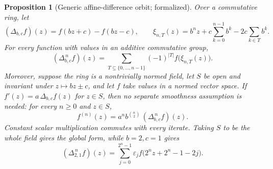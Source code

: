 \documentclass[11pt]{article}
\newtheorem{proposition}[theorem]{Proposition}
\theoremstyle{definition}
\theoremstyle{remark}
\newcommand{\eps}{\varepsilon}
\begin{document}
\begin{proposition}[Generic affine-difference orbit; formalized]
\label{p1:prop:affine-difference-formal}
Over a commutative ring, let
\[
 (\Delta_{b,c}f)(z)=f(bz+c)-f(bz-c),\qquad
 \xi_{n,T}(z)=b^nz+c\sum_{k=0}^{n-1}b^k-2c\sum_{k\in T}b^k .
\]
For every function with values in an additive commutative group,
\begin{equation}
 (\Delta_{b,c}^{\,n}f)(z)
 =\sum_{T\subseteq\{0,\ldots,n-1\}}(-1)^{|T|}f\bigl(\xi_{n,T}(z)\bigr).
 \label{p1:eq:affine-cube-formal}
\end{equation}
Moreover, suppose the ring is a nontrivially normed field, let \(S\) be open and invariant
under \(z\mapsto bz\pm c\), and let \(f\) take values in a normed vector space.  If
\(f'(z)=a\,\Delta_{b,c}f(z)\) for \(z\in S\), then no separate smoothness assumption is
needed: for every \(n\geq0\) and \(z\in S\),
\begin{equation}
 f^{(n)}(z)=a^n b^{\binom n2}\,(\Delta_{b,c}^{\,n}f)(z).
 \label{p1:eq:affine-derivative-formal}
\end{equation}
Constant scalar multiplication commutes with every iterate.  Taking \(S\) to be the
whole field gives the global form, while \(b=2,c=1\) gives
\begin{equation}
 (\Delta_{2,1}^{\,n}f)(z)
 =\sum_{j=0}^{2^n-1}\eps_j f\bigl(2^nz+2^n-1-2j\bigr).
 \label{p1:eq:affine-dyadic-formal}
\end{equation}
\end{proposition}
\end{document}
